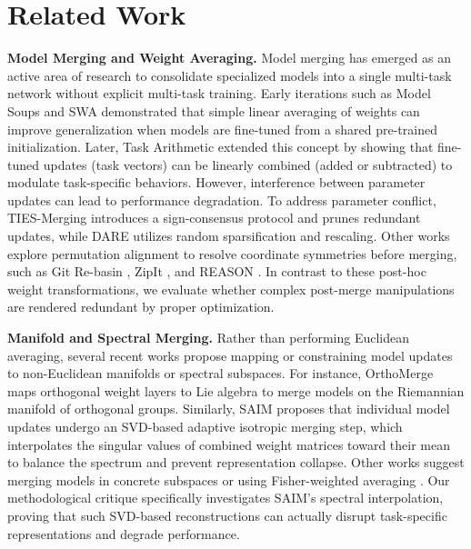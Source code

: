 \section{Related Work}
\label{sec:related}

\textbf{Model Merging and Weight Averaging.} Model merging has emerged as an active area of research to consolidate specialized models into a single multi-task network without explicit multi-task training. Early iterations such as Model Soups \cite{modelsoups} and SWA \cite{weight_averaging} demonstrated that simple linear averaging of weights can improve generalization when models are fine-tuned from a shared pre-trained initialization. Later, Task Arithmetic \cite{taskarithmetic} extended this concept by showing that fine-tuned updates (task vectors) can be linearly combined (added or subtracted) to modulate task-specific behaviors. However, interference between parameter updates can lead to performance degradation. To address parameter conflict, TIES-Merging \cite{tiesmerging} introduces a sign-consensus protocol and prunes redundant updates, while DARE \cite{dare} utilizes random sparsification and rescaling. Other works explore permutation alignment to resolve coordinate symmetries before merging, such as Git Re-basin \cite{gitrebasin}, ZipIt \cite{zipit}, and REASON \cite{reason}. In contrast to these post-hoc weight transformations, we evaluate whether complex post-merge manipulations are rendered redundant by proper optimization.

\textbf{Manifold and Spectral Merging.} Rather than performing Euclidean averaging, several recent works propose mapping or constraining model updates to non-Euclidean manifolds or spectral subspaces. For instance, OrthoMerge \cite{orthomerge2026} maps orthogonal weight layers to Lie algebra to merge models on the Riemannian manifold of orthogonal groups. Similarly, SAIM \cite{saim2026} proposes that individual model updates undergo an SVD-based adaptive isotropic merging step, which interpolates the singular values of combined weight matrices toward their mean to balance the spectrum and prevent representation collapse. Other works suggest merging models in concrete subspaces \cite{concrete_subspace} or using Fisher-weighted averaging \cite{fisher_merging}. Our methodological critique specifically investigates SAIM's spectral interpolation, proving that such SVD-based reconstructions can actually disrupt task-specific representations and degrade performance.

